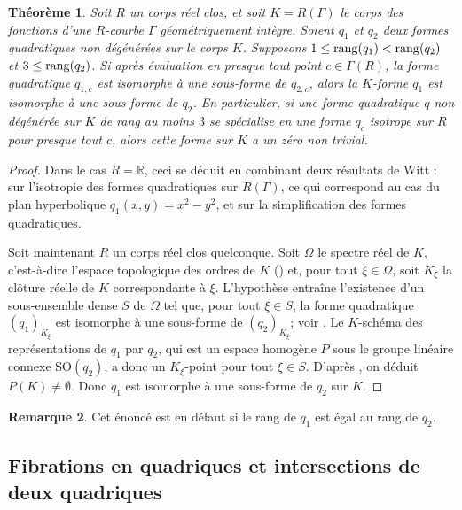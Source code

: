 \documentclass[JEP,XML,SOM,Unicode,francais,published]{cedram}
\newtheorem{thm}{Théorème}[section]
\theoremstyle{definition}
\newtheorem{rmk}[thm]{Remarque}
\newcommand{\R}{\mathbb R}
\begin{document}

\begin{thm}\label{wittgen}
Soit $R$ un corps réel clos, et soit $K=R(\Gamma)$ le corps des fonctions d'une $R$-courbe
$\Gamma$ géométriquement intègre. Soient $q_{1}$ et $q_{2}$ deux formes quadratiques non dégénérées
sur le corps $K$. Supposons $1 \leq {\rm rang}(q_{1}) < {\rm rang}(q_{2})$ et $3 \leq {\rm rang}(q_{2})$.
Si après évaluation en presque tout point $c \in \Gamma(R)$, la forme quadratique
$q_{1,c}$ est isomorphe à une sous-forme de $q_{2,c}$, alors la $K$-forme $q_{1}$
est isomorphe à une sous-forme de $q_{2}$. En particulier, si une forme quadratique $q$
non dégénérée sur $K$ de rang au moins $3$ se spécialise en une forme $q_{c}$
isotrope sur $R$ pour presque tout $c$, alors cette forme sur $K$ a un zéro non trivial.
\end{thm}

\begin{proof}
Dans le cas $R=\R$, ceci se déduit en combinant deux résultats de Witt :
\cite[Satz 22]{witt1937theorie} sur l'isotropie des formes quadratiques sur $R(\Gamma)$, ce qui correspond au cas du plan hyperbolique $q_{1}(x,y)=x^2-y^2$, et \cite[Satz 4]{witt1937theorie} sur la simplification des formes quadratiques.

Soit maintenant $R$ un corps réel clos quelconque. Soit $\Omega$ le spectre réel de $K$, c'est-à-dire l'espace topologique des ordres de $K$ (\cf \cite[(0.4.1)]{scheiderer1994real}) et, pour tout $\xi\in \Omega$, soit $K_\xi$ la clôture réelle de $K$ correspondante à $\xi$. L'hypothèse entraîne l'existence d'un sous-ensemble dense $S$ de $\Omega$ tel que, pour tout $\xi\in S$, la forme quadratique $(q_1)_{K_\xi}$ est isomorphe à une sous-forme de $(q_2)_{K_\xi}$; voir \cite[p.\,308]{scheiderer1996hasse}. Le $K$-schéma des représentations
de $q_{1}$ par $q_{2}$, qui est un espace homogène $P$ sous le groupe linéaire
connexe $\mathrm{SO}(q_{2})$, a donc un $K_\xi$-point pour tout $\xi\in S$. D'après \cite[Cor.\,6.2]{scheiderer1996hasse}, on déduit $P(K)\neq \emptyset$. Donc $q_1$ est isomorphe à une sous-forme de $q_2$ sur $K$.
\end{proof}

\begin{rmk}
Cet énoncé est en défaut si le rang de $q_{1}$ est égal au rang de $q_{2}$.
\end{rmk}

\subsection{Fibrations en quadriques et intersections de deux quadriques}
\end{document}
